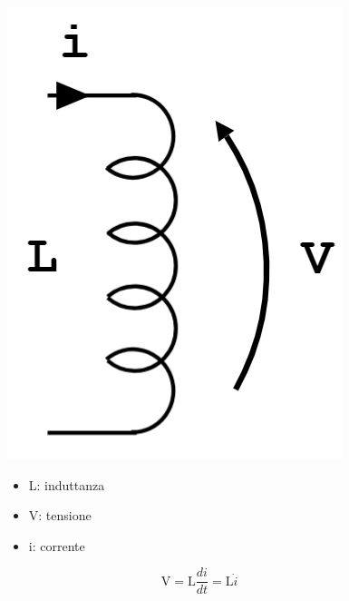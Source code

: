 	\begin{figure}[H]
		\begin{minipage}{.3\textwidth}
			\centering
			\includegraphics[width=.4\linewidth]{"Images/induttore.png"}
		\end{minipage}%
		\begin{minipage}{.3\textwidth}
			\begin{itemize}
				\item L: induttanza
				\item V: tensione
				\item i: corrente
			\end{itemize}
		\end{minipage}
		\begin{minipage}{.3\textwidth}
			\centering
			\begin{equation*}
				\boxed{\text{V} = \text{L}\frac{di}{dt} = \text{L} \dot{i}}
			\end{equation*}
		\end{minipage}
	\end{figure}
	
